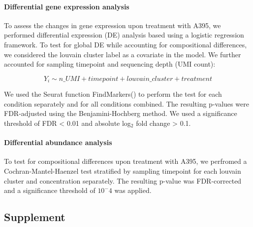 \paragraph{Differential gene expression analysis}
To assess the changes in gene expression upon treatment with A395, we performed differential expression (DE) analysis based using a logistic regression framework. To test for global DE while accounting for compositional differences, we considered the louvain cluster label as a covariate in the model. We further accounted for sampling timepoint and sequencing depth (UMI count):

\[ Y_i \sim n\_UMI + timepoint + louvain\_cluster + treatment \]

We used the Seurat function FindMarkers() to perform the test for each condition separately and for all conditions combined. The resulting p-values were FDR-adjusted using the Benjamini-Hochberg method. We used a significance threshold of FDR < 0.01 and absolute log$_2$ fold change > 0.1.


\paragraph{Differential abundance analysis}
To test for compositional differences upon treatment with A395, we perfromed a Cochran-Mantel-Haenzel test stratified by sampling timepoint for each louvain cluster and concentration separately. The resulting p-value was FDR-corrected and a significance threshold of $10^-4$ was applied.








\clearpage

\subsection{Supplement}
\beginsupplement


